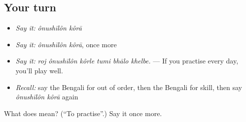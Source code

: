 \subsection*{Your turn}
\begin{itemize}
\raggedright
  \item \emph{Say it:} \emph{ônushīlôn kôrā}
  \item \emph{Say it:} \emph{ônushīlôn kôrā}, once more
  \item \emph{Say it:} \emph{roj ônushīlôn kôrle tumi bhālo khelbe.} — If you practise every day, you'll play well.
  \item \emph{Recall:} say the Bengali for out of order, then the Bengali for skill, then say \emph{ônushīlôn kôrā} again
\end{itemize}

\begin{tcolorbox}[breakable,colback=teal!4,colframe=teal!35!black,title={Before you move on}]
What does   mean? (\textquotedblleft{}To practise\textquotedblright{}.) Say it once more.
\end{tcolorbox}
